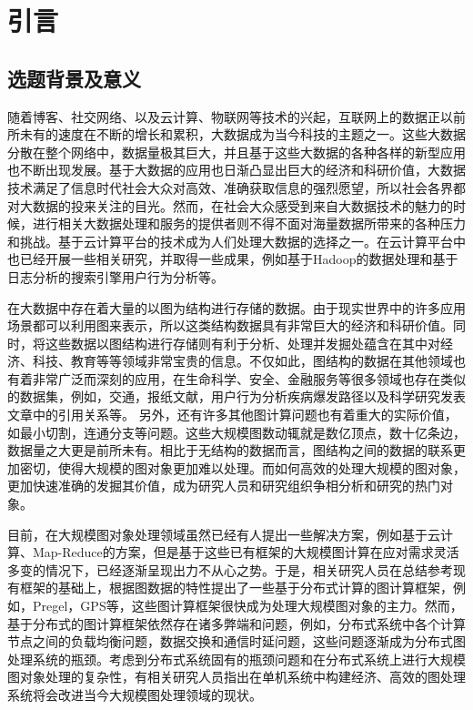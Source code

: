 
\chapter{引言}
\section{选题背景及意义}

随着博客、社交网络、以及云计算、物联网等技术的兴起，互联网上的数据正以前所未有的速度在不断的增长和累积，大数据\cite{liguojie2012,yanxiaofeng2013,taoxuejiao2013,liguojie2012jiazhi,mengxiaofeng2013,wangshan2011jiagoudashuju}成为当今科技的主题之一。这些大数据分散在整个网络中，数据量极其巨大，并且基于这些大数据的各种各样的新型应用也不断出现发展。基于大数据的应用也日渐凸显出巨大的经济和科研价值，大数据技术满足了信息时代社会大众对高效、准确获取信息的强烈愿望，所以社会各界都对大数据的投来关注的目光。然而，在社会大众感受到来自大数据技术的魅力的时候，进行相关大数据处理和服务的提供者则不得不面对海量数据所带来的各种压力和挑战。基于云计算平台的技术\cite{zhangxiangwang2011,yuge2011,yuhuijia2007}成为人们处理大数据的选择之一。在云计算平台中也已经开展一些相关研究，并取得一些成果，例如基于Hadoop的数据处理\cite{zhuzhu2008}和基于日志分析的搜索引擎用户行为分析\cite{yuhuijia2007}等。

在大数据中存在着大量的以图为结构进行存储的数据。由于现实世界中的许多应用场景都可以利用图来表示，所以这类结构数据具有非常巨大的经济和科研价值。同时，将这些数据以图结构进行存储则有利于分析、处理并发掘处蕴含在其中对经济、科技、教育等等领域非常宝贵的信息。不仅如此，图结构的数据在其他领域也有着非常广泛而深刻的应用，在生命科学、安全、金融服务等很多领域也存在类似的数据集，例如，交通，报纸文献，用户行为分析\cite{yuhuijia2007}疾病爆发路径以及科学研究发表文章中的引用关系等。
另外，还有许多其他图计算问题也有着重大的实际价值，如最小切割，连通分支等问题。这些大规模图数动辄就是数亿顶点，数十亿条边，数据量之大更是前所未有。相比于无结构的数据而言，图结构之间的数据的联系更加密切，使得大规模的图对象更加难以处理\cite{lumsdaine2007challenges}。而如何高效的处理大规模的图对象，更加快速准确的发掘其价值，成为研究人员和研究组织争相分析和研究的热门对象。

目前，在大规模图对象处理领域虽然已经有人提出一些解决方案，例如基于云计算\cite{chen2010large}、Map-Reduce\cite{lammel2008google,dean2008mapreduce}的方案，但是基于这些已有框架的大规模图计算在应对需求灵活多变的情况下，已经逐渐呈现出力不从心之势。于是，相关研究人员在总结参考现有框架的基础上，根据图数据的特性提出了一些基于分布式计算的图计算框架，例如，Pregel\cite{malewicz2010pregel}，GPS\cite{salihoglu2013gps}等，这些图计算框架很快成为处理大规模图对象的主力。然而，基于分布式的图计算框架依然存在诸多弊端和问题，例如，分布式系统中各个计算节点之间的负载均衡问题，数据交换和通信时延问题，这些问题逐渐成为分布式图处理系统的瓶颈。考虑到分布式系统固有的瓶颈问题和在分布式系统上进行大规模图对象处理的复杂性，有相关研究人员指出在单机系统中构建经济、高效的图处理系统将会改进当今大规模图处理领域的现状。



